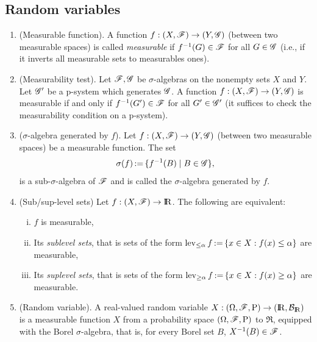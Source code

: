 \documentclass[a4paper,10pt]{article}
\begin{document}
\subsection{Random variables}\label{sec:random_variables}
\begin{enumerate}

 \item (Measurable function). A function $f:(X,\mathscr{F})\to (Y,\mathscr{G})$ (between two measurable spaces) is 
       called \textit{measurable} if $f^{-1}(G) \in \mathscr{F}$ for all $G\in\mathscr{G}$ (i.e., if it inverts all 
       measurable sets to measurables ones).
       
 \item (Measurability test). Let $\mathscr{F},\mathscr{G}$ be $\sigma$-algebras on the nonempty sets $X$ and $Y$. Let $\mathscr{G}'$ be 
       a p-system which generates $\mathscr{G}$. A function $f: (X,\mathscr{F})\to (Y,\mathscr{G})$ is measurable 
       if and only if $f^{-1}(G')\in \mathscr{F}$ for all $G'\in\mathscr{G}'$ (it suffices to check the 
       measurability condition on a p-system).
       
 \item ($\sigma$-algebra generated by $f$). Let $f:(X,\mathscr{F})\to (Y,\mathscr{G})$ (between two measurable spaces) be a measurable
       function. The set 
       \[
        \sigma(f) {}\mathop{\mathrel{:}=}{} \{f^{-1}(B){}\mid{} B\in \mathscr{G}\},
       \]
       is a sub-$\sigma$-algebra of $\mathscr{F}$ and is called the $\sigma$-algebra generated by $f$.
 
 \item (Sub/sup-level sets) Let $f:(X,\F)\to \Re$. The following are equivalent:
      \begin{enumerate}[i.]
       \item $f$ is measurable,
       \item Its \textit{sublevel sets}, that is
       sets of the form $\operatorname{lev}_{\leq \alpha} f {}\mathop{\mathrel{:}=}{} \{x\in X: f(x) \leq \alpha\}$ are measurable,
	\item Its \textit{suplevel sets},
       that is sets of the form $\operatorname{lev}_{ \geq \alpha} f {}\mathop{\mathrel{:}=}{} \{x\in X: f(x) \geq \alpha \}$ are 
       measurable. 
      \end{enumerate}

       
 \item \label{rv220000}
       (Random variable).
       A real-valued random variable $X:\ofp \to (\Re, \B_\Re)$ is a measurable function $X$
       from a probability space $(\Omega,\mathscr{F},\mathrm{P})$ to $\Re$, equipped with the Borel $\sigma$-algebra, that is, 
       for every Borel set $B$, $X^{-1}(B)\in\mathscr{F}$.              
       

\end{enumerate}
\end{document}
